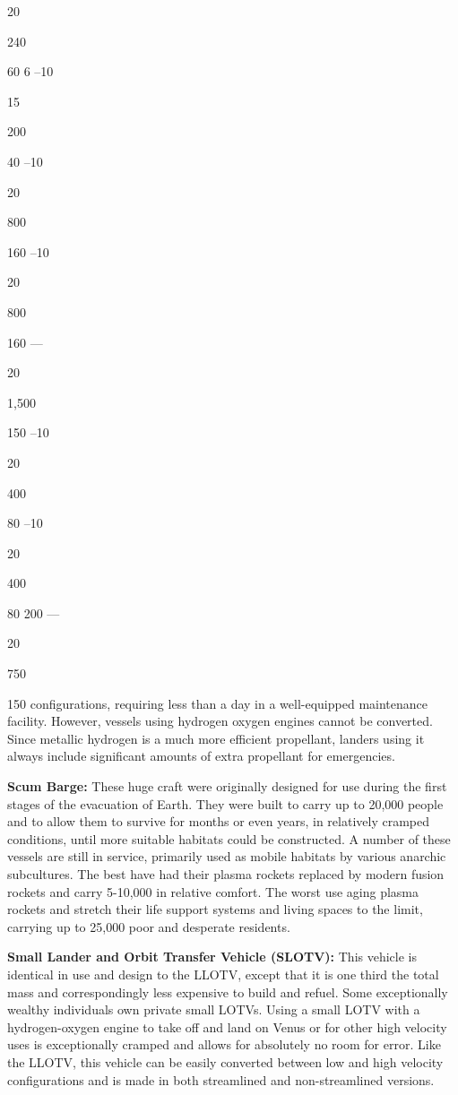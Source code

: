 20

240

60
6
–10

15

200

40
–10

20

800

160
–10

20

800

160
—

20

1,500

150
–10

20

400

80
–10

20

400

80
200
—

20

750

150
configurations, requiring less than a day in a well-equipped
maintenance facility. However, vessels using
hydrogen oxygen engines cannot be converted. Since 
metallic hydrogen is a much more efficient propellant, 
landers using it always include significant amounts of 
extra propellant for emergencies.

\textbf{Scum Barge:} These huge craft were originally designed
for use during the first stages of the evacuation
of Earth. They were built to carry up to 20,000 people 
and to allow them to survive for months or even years, 
in relatively cramped conditions, until more suitable 
habitats could be constructed. A number of these vessels
are still in service, primarily used as mobile habitats
by various anarchic subcultures. The best have
had their plasma rockets replaced by modern fusion 
rockets and carry 5-10,000 in relative comfort. The 
worst use aging plasma rockets and stretch their life 
support systems and living spaces to the limit, carrying
up to 25,000 poor and desperate residents.

\textbf{Small Lander and Orbit Transfer Vehicle (SLOTV): }
This vehicle is identical in use and design to the 
LLOTV, except that it is one third the total mass and 
correspondingly less expensive to build and refuel. 
Some exceptionally wealthy individuals own private 
small LOTVs. Using a small LOTV with a hydrogen-oxygen
engine to take off and land on Venus or for
other high velocity uses is exceptionally cramped 
and allows for absolutely no room for error. Like the 
LLOTV, this vehicle can be easily converted between 
low and high velocity configurations and is made in 
both streamlined and non-streamlined versions.

